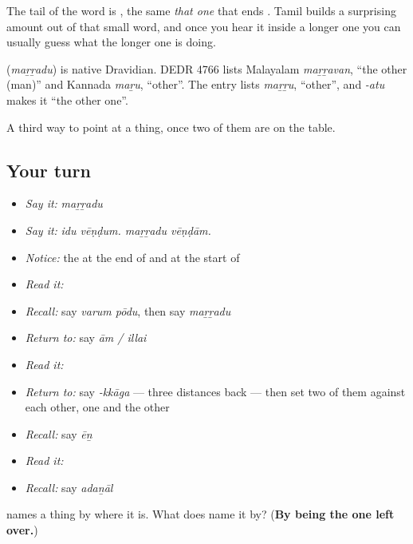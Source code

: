 The tail of the word is \textbf{}, the same \emph{that one} that ends . Tamil builds a surprising amount out of that small word, and once you hear it inside a longer one you can usually guess what the longer one is doing.

\begin{cousinweb}
\textbf{} (\emph{maṟṟadu}) is native Dravidian. DEDR 4766 lists Malayalam \emph{maṟṟavan}, \textquotedblleft{}the other (man)\textquotedblright{} and Kannada \emph{maṟu}, \textquotedblleft{}other\textquotedblright{}. The entry lists \emph{maṟṟu}, \textquotedblleft{}other\textquotedblright{}, and \emph{-atu} makes it \textquotedblleft{}the other one\textquotedblright{}.
\end{cousinweb}

\begin{grammarlens}[title={What you've built}]
A third way to point at a thing, once two of them are on the table.
\end{grammarlens}

\subsection*{Your turn}
\begin{itemize}
\raggedright
  \item \emph{Say it:} \emph{maṟṟadu}
  \item \emph{Say it:} \emph{idu vēṇḍum. maṟṟadu vēṇḍām.}
  \item \emph{Notice:} the  at the end of  and at the start of 
  \item \emph{Read it:} \textbf{}
  \item \emph{Recall:} say \emph{varum pōdu}, then say \emph{maṟṟadu}
  \item \emph{Return to:} say \emph{ām / illai}
  \item \emph{Read it:} \textbf{}
  \item \emph{Return to:} say \emph{-kkāga} — three distances back — then set two of them against each other, one and the other
  \item \emph{Recall:} say \emph{ēṉ}
  \item \emph{Read it:} \textbf{}
  \item \emph{Recall:} say \emph{adaṉāl}
\end{itemize}

\begin{tcolorbox}[breakable,colback=teal!4,colframe=teal!35!black,title={Before you move on}]
 names a thing by where it is. What does  name it by? (\textbf{By being the one left over.})
\end{tcolorbox}
